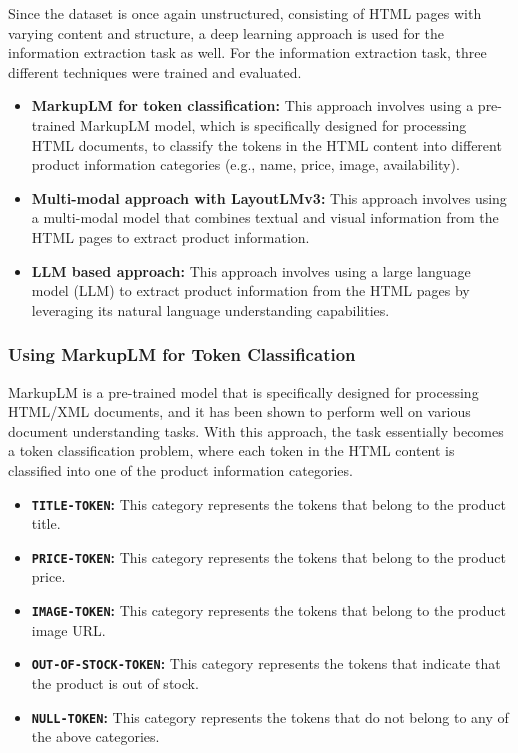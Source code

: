 Since the dataset is once again unstructured, consisting of HTML pages with varying content and structure, a deep learning approach is used for the information extraction task as well.
For the information extraction task, three different techniques were trained and evaluated.
\begin{itemize}
    \item \textbf{MarkupLM for token classification:} This approach involves using a pre-trained MarkupLM model, which is specifically designed for processing HTML documents, to classify the tokens in the HTML content into different product information categories (e.g., name, price, image, availability).
    \item \textbf{Multi-modal approach with LayoutLMv3:} This approach involves using a multi-modal model that combines textual and visual information from the HTML pages to extract product information.
    \item \textbf{LLM based approach:} This approach involves using a large language model (LLM) to extract product information from the HTML pages by leveraging its natural language understanding capabilities.
\end{itemize}

\subsubsection{Using MarkupLM for Token Classification}
MarkupLM is a pre-trained model that is specifically designed for processing HTML/XML documents, and it has been shown to perform well on various document understanding tasks.
With this approach, the task essentially becomes a token classification problem, where each token in the HTML content is classified into one of the product information categories.
\begin{itemize}
    \item \textbf{\texttt{TITLE-TOKEN}:} This category represents the tokens that belong to the product title.
    \item \textbf{\texttt{PRICE-TOKEN}:} This category represents the tokens that belong to the product price.
    \item \textbf{\texttt{IMAGE-TOKEN}:} This category represents the tokens that belong to the product image URL.
    \item \textbf{\texttt{OUT-OF-STOCK-TOKEN}:} This category represents the tokens that indicate that the product is out of stock.
    \item \textbf{\texttt{NULL-TOKEN}:} This category represents the tokens that do not belong to any of the above categories.
\end{itemize}

